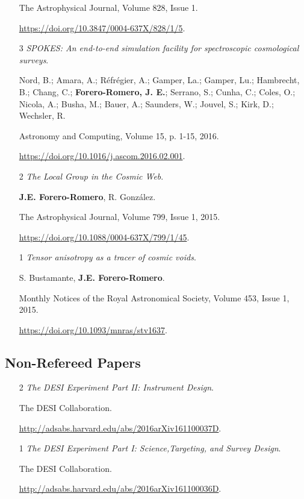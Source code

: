 \documentclass{article}
\begin{document}
\begin{itemize}
The Astrophysical Journal, Volume 828, Issue 1.

\url{https://doi.org/10.3847/0004-637X/828/1/5}.

\item[3]{\it SPOKES: An end-to-end simulation facility for
  spectroscopic cosmological surveys}.
 
	Nord, B.; Amara, A.; R\'efr\'egier, A.; Gamper, La.; Gamper, Lu.;
        Hambrecht, B.; Chang, C.; {\bf Forero-Romero, J. E.}; Serrano, S.;
        Cunha, C.; Coles, O.; Nicola, A.; Busha, M.; Bauer, A.;
        Saunders, W.; Jouvel, S.; Kirk, D.; Wechsler, R.

Astronomy and Computing, Volume 15, p. 1-15, 2016.

\url{https://doi.org/10.1016/j.ascom.2016.02.001}.

\item[2]{\it The Local Group in the Cosmic Web}.

{\bf J.E. Forero-Romero}, R. González.

The Astrophysical Journal, Volume 799, Issue 1, 2015.

\url{https://doi.org/10.1088/0004-637X/799/1/45}.

\item[1] {\it Tensor anisotropy as a tracer of cosmic voids}. 

S. Bustamante, {\bf J.E. Forero-Romero}. 

Monthly Notices of the Royal Astronomical Society, Volume 453, Issue 1, 2015.

\url{https://doi.org/10.1093/mnras/stv1637}.

\end{itemize}

\subsection{Non-Refereed Papers}

\begin{itemize}

\item[2] 
{\it The DESI Experiment Part II: Instrument Design}. 

The DESI Collaboration. 

\url{http://adsabs.harvard.edu/abs/2016arXiv161100037D}.


\item[1] 
{\it The DESI Experiment Part I: Science,Targeting, and Survey
  Design}. 

The DESI Collaboration. 

\url{http://adsabs.harvard.edu/abs/2016arXiv161100036D}.




\end{itemize}
\end{document}
